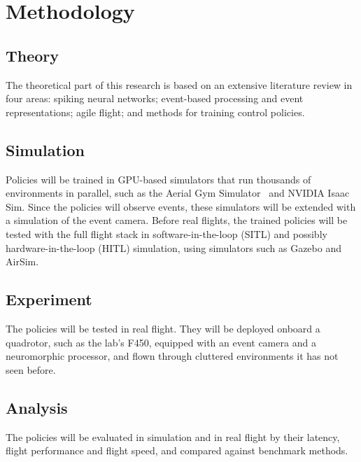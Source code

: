 \section{Methodology}
\label{sec:methodology}

\subsection{Theory}
The theoretical part of this research is based on an extensive literature review in four areas: spiking neural networks; event-based processing and event representations; agile flight; and methods for training control policies.

\subsection{Simulation}
\label{subsec:simulation}
Policies will be trained in GPU-based simulators that run thousands of environments in parallel, such as the Aerial Gym Simulator~\cite{kulkarniAerialGymSimulator2025a} and NVIDIA Isaac Sim. Since the policies will observe events, these simulators will be extended with a simulation of the event camera. Before real flights, the trained policies will be tested with the full flight stack in software-in-the-loop (SITL) and possibly hardware-in-the-loop (HITL) simulation, using simulators such as Gazebo and AirSim.

\subsection{Experiment}
The policies will be tested in real flight. They will be deployed onboard a quadrotor, such as the lab's F450, equipped with an event camera and a neuromorphic processor, and flown through cluttered environments it has not seen before.

\subsection{Analysis}
The policies will be evaluated in simulation and in real flight by their latency, flight performance and flight speed, and compared against benchmark methods.

